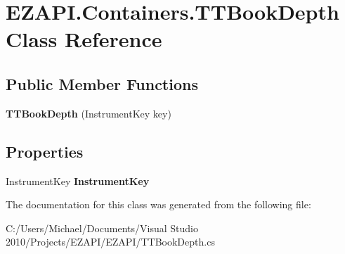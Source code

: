\hypertarget{class_e_z_a_p_i_1_1_containers_1_1_t_t_book_depth}{\section{E\-Z\-A\-P\-I.\-Containers.\-T\-T\-Book\-Depth Class Reference}
\label{class_e_z_a_p_i_1_1_containers_1_1_t_t_book_depth}
}
\subsection*{Public Member Functions}
\begin{DoxyCompactItemize}
\item 
\hypertarget{class_e_z_a_p_i_1_1_containers_1_1_t_t_book_depth_af5e11c123a73d5b1e3804fd4f4e6b36d}{{\bfseries T\-T\-Book\-Depth} (Instrument\-Key key)}\label{class_e_z_a_p_i_1_1_containers_1_1_t_t_book_depth_af5e11c123a73d5b1e3804fd4f4e6b36d}

\end{DoxyCompactItemize}
\subsection*{Properties}
\begin{DoxyCompactItemize}
\item 
\hypertarget{class_e_z_a_p_i_1_1_containers_1_1_t_t_book_depth_a71f74ccc1532637b1bff16359b68b8b3}{Instrument\-Key {\bfseries Instrument\-Key}}\label{class_e_z_a_p_i_1_1_containers_1_1_t_t_book_depth_a71f74ccc1532637b1bff16359b68b8b3}

\end{DoxyCompactItemize}


The documentation for this class was generated from the following file\-:\begin{DoxyCompactItemize}
\item 
C\-:/\-Users/\-Michael/\-Documents/\-Visual Studio 2010/\-Projects/\-E\-Z\-A\-P\-I/\-E\-Z\-A\-P\-I/T\-T\-Book\-Depth.\-cs\end{DoxyCompactItemize}
